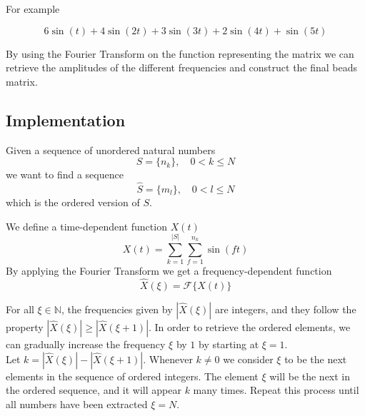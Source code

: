 \documentclass{article}
\begin{document}
For example

\begin{minipage}{0.3\textwidth}
    \begin{flushright}        
    \end{flushright}
\end{minipage}
\begin{minipage}{0.5\textwidth}
    \[
        6\sin(t) + 4\sin(2t) + 3\sin(3t) + 2\sin(4t)+\sin(5t)
    \]
\end{minipage}

By using the Fourier Transform on the function representing the matrix
we can retrieve the amplitudes of the different frequencies
and construct the final beads matrix.

\subsection{Implementation}

Given a sequence of unordered natural numbers
\[
    S=\{n_k\},
    \quad
    0 < k \leq N
\]
we want to find a sequence
\[
    \hat{S}=\{m_l\},
    \quad
    0 < l \leq N
\]
which is the ordered version of \(S\).

We define a time-dependent function \(X(t)\)
\[
    X(t)=
    \sum_{k=1}^{|S|}
    \sum_{f=1}^{n_k}
    \sin(ft)
\]
By applying the Fourier Transform we get a frequency-dependent function
\[
    \hat{X}(\xi)=\mathcal{F}\{X(t)\}
\]

For all \(\xi \in \mathbb{N}\), the frequencies given by
\(|\hat{X}(\xi)|\) are integers, and they follow the property
\(|\hat{X}(\xi)| \geq |\hat{X}(\xi+1)|\).
In order to retrieve the ordered elements, we can gradually increase
the frequency \(\xi\) by \(1\) by starting at \(\xi=1\). \\
Let \(k=|\hat{X}(\xi)| - |\hat{X}(\xi+1)|\). Whenever \(k \neq 0\)
we consider \(\xi\) to be the next elements in the sequence of ordered
integers. The element \(\xi\) will be the next in the ordered sequence,
and it will appear \(k\) many times.
Repeat this process until all numbers have been extracted \(\xi = N\).
\end{document}
